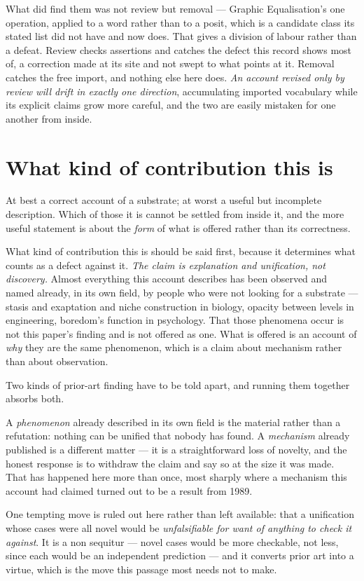 \documentclass[11pt,a4paper]{article}
\begin{document}
What did find them was not review but removal --- Graphic Equalisation's one operation, applied to a word
rather than to a posit, which is a candidate class its stated list did not have and now does. That
gives a division of labour rather than a defeat. Review checks assertions and catches the defect this
record shows most of, a correction made at its site and not swept to what points at it. Removal
catches the free import, and nothing else here does. \emph{An account revised only by review will drift
in exactly one direction}, accumulating imported vocabulary while its explicit claims grow more
careful, and the two are easily mistaken for one another from inside.

\section{What kind of contribution this is}\label{sec:contribution}
At best a correct account of a substrate; at worst a useful but incomplete description. Which of
those it is cannot be settled from inside it, and the more useful statement is about the \emph{form}
of what is offered rather than its correctness.

What kind of contribution this is should be said first, because it determines what counts as a defect
against it. \emph{The claim is explanation and unification, not discovery.} Almost everything this
account describes has been observed and named already, in its own field, by people who were not
looking for a substrate --- stasis and exaptation and niche construction in biology, opacity between
levels in engineering, boredom's function in psychology. That those phenomena occur is not this
paper's finding and is not offered as one. What is offered is an account of \emph{why} they are the
same phenomenon, which is a claim about mechanism rather than about observation.

Two kinds of prior-art finding have to be told apart, and running them together absorbs both.

A \emph{phenomenon} already described in its own field is the material rather than a refutation:
nothing can be unified that nobody has found. A \emph{mechanism} already published is a different
matter --- it is a straightforward loss of novelty, and the honest response is to withdraw the claim
and say so at the size it was made. That has happened here more than once, most sharply where a
mechanism this account had claimed turned out to be a result from 1989.

One tempting move is ruled out here rather than left available: that a unification whose cases were
all novel would be \emph{unfalsifiable for want of anything to check it against}. It is a non
sequitur --- novel cases would be more checkable, not less, since each would be an independent
prediction --- and it converts prior art into a virtue, which is the move this passage most needs not
to make.
\end{document}
